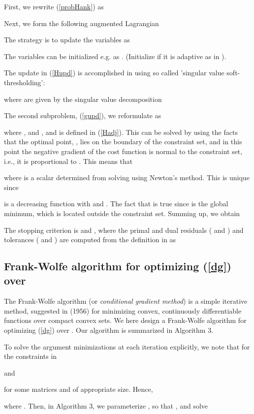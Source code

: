 \documentclass{article}
\begin{document}
First, we rewrite (\ref{probHank}) as

Next, we form the following augmented Lagrangian

The strategy is to update the variables as

The variables can be initialized e.g. as . (Initialize  if it is adaptive as in \cite{Boyd:2010}).

The  update in (\ref{Hupd}) is accomplished in \cite{Liu:2013} using so called 'singular value soft-thresholding':

where  are given by the singular value decomposition


The second subproblem, (\ref{gupd}), we reformulate as

where ,  and , and  is defined in (\ref{Hadj}). This can be solved by using the facts that the optimal point, , lies on the boundary of the constraint set, and in this point the negative gradient of the cost function is normal to the constraint set, i.e., it is proportional to . This means that

where  is a scalar determined from solving  using Newton's method. This  is unique since

is a decreasing function with  and . The fact that  is true since  is the global minimum, which is located outside the constraint set. Summing up, we obtain


The stopping criterion is  and , where the primal and dual residuals ( and ) and tolerances ( and ) are computed from the definition in \cite[Sec.~3]{Boyd:2010} as


\subsection{Frank-Wolfe algorithm for optimizing (\ref{dg}) over }

The Frank-Wolfe algorithm (or \textit{conditional gradient method}) is a simple iterative method, suggested in \cite{Frank:1956} (1956) for minimizing convex, continuously differentiable functions  over compact convex sets. We here design a Frank-Wolfe algorithm for optimizing (\ref{dg}) over . Our algorithm is summarized in Algorithm 3.

To solve the argument minimizations at each iteration explicitly, we note that for the constraints in 

and

for some matrices  and  of appropriate size. Hence,

where . Then, in Algorithm 3, we parameterize , so that , and solve
\end{document}

